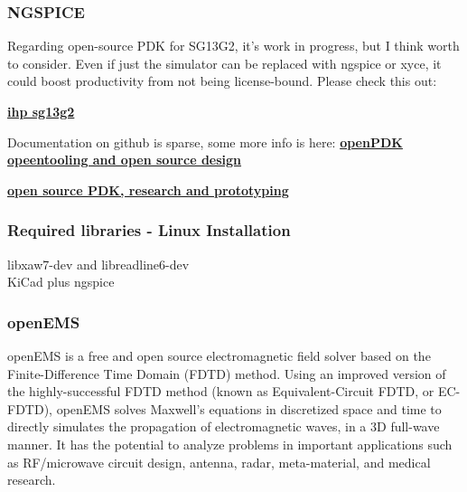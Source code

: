 
\subsubsection{NGSPICE}

Regarding open-source PDK for SG13G2, it's work in progress, but I think worth to consider. Even if just the simulator can be replaced with ngspice or xyce, it could boost productivity from not being license-bound. Please check this out:

\href{https://github.com/IHP-GmbH/IHP-Open-PDK/tree/main/ihp-sg13g2}{\textbf{ihp sg13g2}}

Documentation on github is sparse, some more info is here:
\href{https://www.ihp-microelectronics.com/events-1/detail/openpdk-opentooling-and-open-source-design-an-initiative-to-push-development}{\textbf{openPDK opeentooling and open source design}}

\href{https://www.ihp-microelectronics.com/services/research-and-prototyping-service/fast-design-enablement/open-source-pdk}{\textbf{open source PDK, research and prototyping}}

\subsubsection{Required libraries - Linux Installation}

libxaw7-dev and libreadline6-dev
\\
KiCad plus ngspice


\subsubsection{openEMS}

openEMS is a free and open source electromagnetic field solver based on the Finite-Difference Time Domain (FDTD) method. Using an improved version of the highly-successful FDTD method (known as Equivalent-Circuit FDTD, or EC-FDTD), openEMS solves Maxwell's equations in discretized space and time to directly simulates the propagation of electromagnetic waves, in a 3D full-wave manner. It has the potential to analyze problems in important applications such as RF/microwave circuit design, antenna, radar, meta-material, and medical research.

